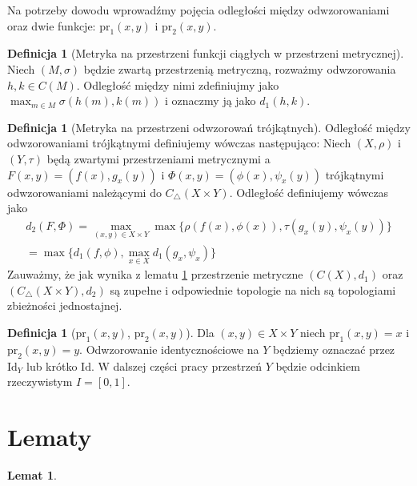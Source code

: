 \documentclass[licencjacka]{pwr_wmat_praca_dyplomowa}
\theoremstyle{plain}
\numberwithin{theorem}{chapter}
\newtheorem{lemma}[theorem]{Lemat}
\theoremstyle{definition}
\numberwithin{theorem}{chapter}
\newtheorem{definition}[theorem]{Definicja}
\begin{document}
Na potrzeby dowodu wprowadźmy pojęcia odległości między odwzorowaniami oraz dwie funkcje: $\textrm{pr}_1(x, y)$ i $\textrm{pr}_2(x, y)$. 

\begin{definition}[Metryka na przestrzeni funkcji ciągłych w przestrzeni metrycznej]
Niech $(M, \sigma)$ będzie zwartą przestrzenią metryczną, rozważmy odwzorowania $h,k \in C(M)$. Odległość między nimi zdefiniujmy jako $\max_{m \in M} \sigma(h(m), k(m))$ i oznaczmy ją jako $d_1(h,k)$.
\end{definition}



\begin{definition}[Metryka na przestrzeni odwzorowań trójkątnych]
Odległość między odwzorowaniami trójkątnymi definiujemy wówczas następująco: Niech $(X, \rho)$ i $(Y, \tau)$ będą zwartymi przestrzeniami metrycznymi a $F(x,y) = (f(x), g_x(y))$ i $\Phi(x,y) = (\phi(x), \psi_x(y))$ trójkątnymi odwzorowaniami należącymi do $C_\triangle(X \times Y)$. Odległość definiujemy wówczas jako 
\begin{align*}
d_2(F, \Phi) = \max_{(x,y) \in X \times Y} \max\{\rho(f(x),\phi(x)), \tau(g_x(y), \psi_x(y))\} \\ 
= \max\{d_1(f,\phi), \max_{x \in X}d_1(g_x, \psi_x)\}
\end{align*}
Zauważmy, że jak wynika z lematu \ref{przestrzenie_ciaglych_i_ciaglych_trojkatnych_sa_zupelne} przestrzenie metryczne $(C(X), d_1)$ oraz $(C_\triangle(X \times Y), d_2)$ są zupełne i odpowiednie topologie na nich są topologiami zbieżności jednostajnej.
\end{definition}

\begin{definition}[$\textrm{pr}_1(x, y)$, $\textrm{pr}_2(x, y)$]
Dla $(x, y) \in X \times Y$ niech $\textrm{pr}_1(x, y) = x$ i $\textrm{pr}_2(x, y) = y$. Odwzorowanie identycznościowe na $Y$ będziemy oznaczać przez $\textrm{Id}_Y$ lub krótko $\textrm{Id}$. W dalszej części pracy przestrzeń $Y$ będzie odcinkiem rzeczywistym $I = [0, 1]$.
\end{definition}





\section{Lematy}


\begin{lemma}\label{przestrzenie_ciaglych_i_ciaglych_trojkatnych_sa_zupelne}
\end{lemma}
\end{document}
